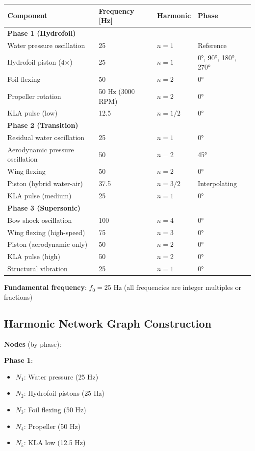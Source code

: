 \documentclass[12pt,a4paper]{article}
\begin{document}
\begin{center}
\begin{tabular}{|l|l|l|l|}
\hline
\textbf{Component} & \textbf{Frequency [Hz]} & \textbf{Harmonic} & \textbf{Phase} \\
\hline
\textbf{Phase 1 (Hydrofoil)} & & & \\
Water pressure oscillation & 25 & $n=1$ & Reference \\
Hydrofoil piston (4×) & 25 & $n=1$ & 0°, 90°, 180°, 270° \\
Foil flexing & 50 & $n=2$ & 0° \\
Propeller rotation & 50 Hz (3000 RPM) & $n=2$ & 0° \\
KLA pulse (low) & 12.5 & $n=1/2$ & 0° \\
\hline
\textbf{Phase 2 (Transition)} & & & \\
Residual water oscillation & 25 & $n=1$ & 0° \\
Aerodynamic pressure oscillation & 50 & $n=2$ & 45° \\
Wing flexing & 50 & $n=2$ & 0° \\
Piston (hybrid water-air) & 37.5 & $n=3/2$ & Interpolating \\
KLA pulse (medium) & 25 & $n=1$ & 0° \\
\hline
\textbf{Phase 3 (Supersonic)} & & & \\
Bow shock oscillation & 100 & $n=4$ & 0° \\
Wing flexing (high-speed) & 75 & $n=3$ & 0° \\
Piston (aerodynamic only) & 50 & $n=2$ & 0° \\
KLA pulse (high) & 50 & $n=2$ & 0° \\
Structural vibration & 25 & $n=1$ & 0° \\
\hline
\end{tabular}
\end{center}

\textbf{Fundamental frequency}: $f_0 = 25$ Hz (all frequencies are integer multiples or fractions)

\subsection{Harmonic Network Graph Construction}

\textbf{Nodes} (by phase):

\textbf{Phase 1}:
\begin{itemize}
\item $N_1$: Water pressure (25 Hz)
\item $N_2$: Hydrofoil pistons (25 Hz)
\item $N_3$: Foil flexing (50 Hz)
\item $N_4$: Propeller (50 Hz)
\item $N_5$: KLA low (12.5 Hz)
\end{itemize}
\end{document}
